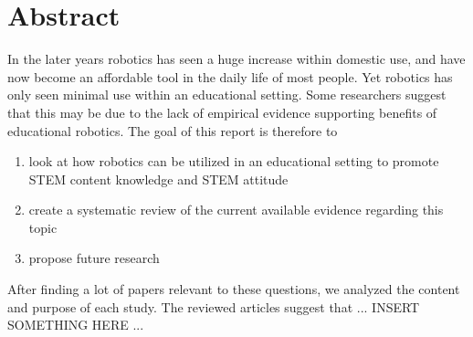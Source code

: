 \section*{Abstract}
	In the later years robotics has seen a huge increase within domestic use, and have now become an affordable tool in the daily life of most people.
	Yet robotics has only seen minimal use within an educational setting. Some researchers suggest that this may be due to the lack of empirical evidence
	supporting benefits of educational robotics. 
	The goal of this report is therefore to 
	\begin{enumerate}
		\item look at how robotics can be utilized in an educational setting to promote STEM content knowledge and STEM attitude
		\item create a systematic review of the current available evidence regarding this topic
		\item propose future research
	\end{enumerate}
	
	\bigskip\noindent
	After finding a lot of papers relevant to these questions, we analyzed the content and purpose of each study.
	The reviewed articles suggest that ... INSERT SOMETHING HERE ...
	
	